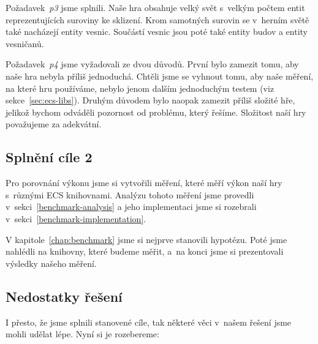 Požadavek~\textit{p3} jsme splnili. Naše hra obsahuje velký svět s~velkým počtem entit reprezentujících suroviny ke sklizení. Krom samotných surovin se v~herním světě také nacházejí entity vesnic. Součástí vesnic jsou poté také entity budov a entity vesničanů.

Požadavek~\textit{p4} jsme vyžadovali ze dvou důvodů. První bylo zamezit tomu, aby naše hra nebyla příliš jednoduchá. Chtěli jsme se vyhnout tomu, aby naše měření, na které hru používáme, nebylo jenom dalším jednoduchým testem (viz sekce~\ref{sec:ecs-libs}). Druhým důvodem bylo naopak zamezit příliš složité hře, jelikož bychom odváděli pozornost od problému, který řešíme. Složitost naší hry považujeme za adekvátní.

\subsection{Splnění cíle 2}
Pro porovnání výkonu jsme si vytvořili měření, které měří výkon naší hry s~různými ECS knihovnami. Analýzu tohoto měření jsme provedli v~sekci~\ref{benchmark-analysis} a jeho implementaci jsme si rozebrali v~sekci~\ref{benchmark-implementation}.

V kapitole~\ref{chap:benchmark} jsme si nejprve stanovili hypotézu. Poté jsme nahlédli na knihovny, které budeme měřit, a~na konci jsme si prezentovali výsledky našeho měření.

\subsection{Nedostatky řešení}
I přesto, že jsme splnili stanovené cíle, tak některé věci v~našem řešení jsme mohli udělat lépe. Nyní si je rozebereme:

